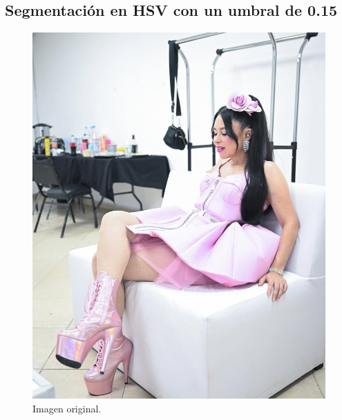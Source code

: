 \documentclass[11pt, letterpaper]{article}
\begin{document}
\subsection{Segmentación en HSV con un umbral de 0.15}

\begin{figure}[h!]
	\centering
	\begin{minipage}{0.35\textwidth}
		\centering
		\includegraphics[width=\textwidth]{IMG/IM4.jpeg}
		\caption*{Imagen original.}
	\end{minipage}\hfill
	\begin{minipage}{0.35\textwidth}
		\centering

\end{minipage}
\end{figure}
\end{document}
